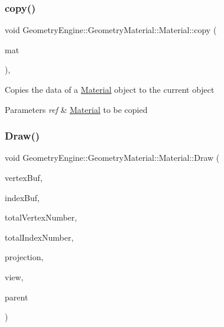 \subsubsection{\texorpdfstring{copy()}{copy()}}
{\footnotesize\ttfamily void Geometry\+Engine\+::\+Geometry\+Material\+::\+Material\+::copy (\begin{DoxyParamCaption}\item[{const \mbox{\hyperlink{class_geometry_engine_1_1_geometry_material_1_1_material}{Material}} \&}]{mat }\end{DoxyParamCaption})\hspace{0.3cm}{\ttfamily [protected]}, {\ttfamily [virtual]}}

Copies the data of a \mbox{\hyperlink{class_geometry_engine_1_1_geometry_material_1_1_material}{Material}} object to the current object 
\begin{DoxyParams}{Parameters}
{\em ref} & \mbox{\hyperlink{class_geometry_engine_1_1_geometry_material_1_1_material}{Material}} to be copied \\
\hline
\end{DoxyParams}
\mbox{\label{class_geometry_engine_1_1_geometry_material_1_1_material_ae337c74e4f500d0a881779c2c3495908}} 
\subsubsection{\texorpdfstring{Draw()}{Draw()}}
{\footnotesize\ttfamily void Geometry\+Engine\+::\+Geometry\+Material\+::\+Material\+::\+Draw (\begin{DoxyParamCaption}\item[{Q\+Open\+G\+L\+Buffer $\ast$}]{vertex\+Buf,  }\item[{Q\+Open\+G\+L\+Buffer $\ast$}]{index\+Buf,  }\item[{unsigned int}]{total\+Vertex\+Number,  }\item[{unsigned int}]{total\+Index\+Number,  }\item[{const Q\+Matrix4x4 \&}]{projection,  }\item[{const Q\+Matrix4x4 \&}]{view,  }\item[{const \mbox{\hyperlink{class_geometry_engine_1_1_geometry_world_item_1_1_geometry_item_1_1_geometry_item}{Geometry\+World\+Item\+::\+Geometry\+Item\+::\+Geometry\+Item}} \&}]{parent }\end{DoxyParamCaption})\hspace{0.3cm}{\ttfamily [virtual]}}

